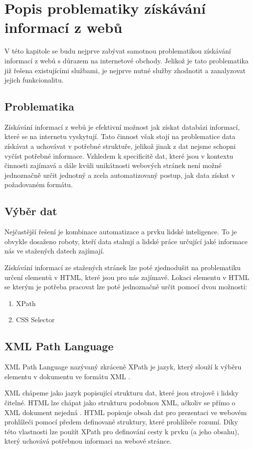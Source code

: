 \documentclass[thesis=B,czech]{FITthesis}[2012/06/26]
\begin{document}
\newpage


\chapter{Popis problematiky získávání informací z webů}

V této kapitole se budu nejprve zabývat samotnou problematikou získávání informací 
z webů s důrazem na internetové obchody.
Jelikož je tato problematika již řešena existujícími službami, je nejprve nutné služby zhodnotit a zanalyzovat jejich funkcionalitu.


\section{Problematika}
Získávání informací z webů je efektivní možnost jak získat databázi informací, které se na internetu vyskytují.
Tato činnost však stojí na problematice data získávat a uchovávat v potřebné struktuře, jelikož 
jinak z dat nejsme schopni vyčíst potřebné informace.
Vzhledem k specificitě dat, které jsou v kontextu činnosti zajímavá a dále kvůli unikátnosti webových stránek
není možné jednoznačně určit jednotný a zcela automatizovaný postup, jak data získat v požadovaném formátu.

\newpage

\section{Výběr dat}
Nejčastější řešení je kombinace automatizace a prvku lidské inteligence.
To je obvykle dosaženo roboty, kteří data stahují a lidské práce určující jaké informace nás ve stažených datech zajímají.
\par
Získávání informací ze stažených stránek lze poté zjednodušit na problematiku určení elementů v HTML, které jsou pro 
nás zajímavé.
Lokaci elementu v HTML se kterým je potřeba pracovat lze poté jednoznačně určit pomocí dvou možností:
\begin{enumerate}
\item XPath
\item CSS Selector
\end{enumerate}

\section{XML Path Language}
XML Path Language\cite{XPath} nazývaný zkráceně XPath je jazyk, který slouží k výběru elementu v dokumentu ve formátu XML\cite{XML} .
\par
XML chápeme jako jazyk popisující strukturu dat, které jsou strojově i lidsky čitelné.
HTML lze chápat jako strukturu podobnou XML, ačkoliv se přímo o XML dokument nejedná \cite{HTML}. HTML popisuje obsah dat pro prezentaci ve webovém prohlížeči pomocí předem definované struktury, které prohlížeče rozumí.
Díky této vlastnosti lze použít XPath pro definování cesty k prvku (a jeho obsahu),
který uchovává potřebnou informaci na webové stránce.
\par
\end{document}
